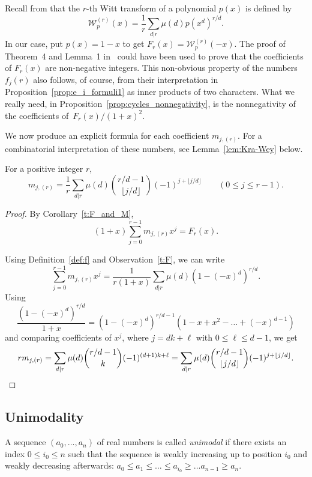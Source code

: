\begin{remark}
    Recall from \cite{Moree} that the $r$-th Witt transform of a polynomial $p(x)$ is defined by 
    \[
        \mathcal{W}_p^{(r)}(x)=\frac{1}{r}\sum_{d|r}\mu(d)p(x^d)^{r/d}.
    \] 
    In our case, put $p(x)=1-x$ to get $F_r(x) = \mathcal{W}_p^{(r)}(-x)$. 
    The proof of Theorem~4 and Lemma~1 in~\cite{Moree} could have been used to prove that the coefficients of $F_r(x)$ are non-negative integers. This non-obvious property of the numbers $f_j(r)$ also follows, of course, from their interpretation in Proposition~\ref{prop:e_i_formuli1} as inner products of two characters.
    What we really need, in Proposition~\ref{prop:cycles_nonnegativity}, is the nonnegativity of the coefficients of~$F_r(x)/(1+x)^2$.
\end{remark}

We now produce an explicit formula for each coefficient $m_{j,(r)}$. For a combinatorial interpretation of these numbers, see Lemma~\ref{lem:Kra-Wey} below.

\begin{lemma}\label{t:m_formula}
    For a positive integer $r$,
    \[
		m_{j,(r)}
		= \frac{1}{r} \sum_{d|r} \mu(d) \binom{r/d - 1}{\lfloor j/d \rfloor}  (-1)^{j+\lfloor j/d \rfloor} 
		\qquad (0 \le j \le r-1).
    \]
\end{lemma}
\begin{proof}
	By Corollary~\ref{t:F_and_M},
	\[
	    (1+x) \sum_{j=0}^{r-1} m_{j,(r)}x^j=F_r(x). 
	\]
	
	Using Definition~\ref{def:f} and Observation~\ref{t:F},
	we can write
	\[
	    \sum_{j=0}^{r-1} m_{j,(r)} x^j 
	    = \frac{1}{r(1+x)} \sum_{d|r} \mu(d) (1-(-x)^d)^{r/d}.
    \]
	Using
	\[
		\frac{(1-(-x)^d)^{r/d}}{1+x} 
		= (1-(-x)^d)^{r/d-1} (1 - x + x^2 - \ldots +(-x)^{d-1})
	\]
	and comparing coefficients of $x^j$, where $j = dk + \ell$ with $0 \le \ell \le d-1$, we get
	\[
		r m_{j,(r)}
		= \sum_{d|r} \mu(d) \binom{r/d - 1}{k}  (-1)^{(d+1)k + \ell}
		= \sum_{d|r} \mu(d) \binom{r/d - 1}{\lfloor j/d \rfloor}  (-1)^{j+\lfloor j/d \rfloor}.
        \qedhere
	\]
\end{proof}


\subsection{Unimodality}
\label{sec:unimodality}
	
A sequence $(a_0,\ldots,a_n)$ of real numbers is called {\em unimodal} if there exists an index $0 \le i_0 \le n$ such that the sequence is weakly increasing up to position $i_0$ and weakly decreasing afterwards:
$a_0 \le a_1 \le \ldots \le a_{i_0} \ge \ldots a_{n-1} \ge a_n$.
	

